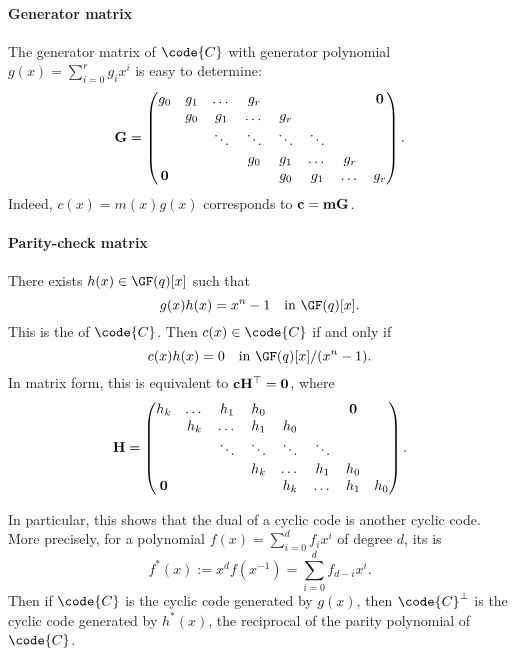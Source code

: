 \documentclass[a4paper, 11pt, openany]{book}
\begin{document}
\paragraph{Generator matrix}
The generator matrix of $\code{C}$ with generator polynomial $g(x) = \sum_{i=0}^r g_i x^i$ is easy to determine:
\[
	{\bf G} = \begin{pmatrix}
	g_0		& g_1	& \dots 	& g_r 		& 			& 			& 		& {\bf 0}\\
			& g_0	& g_1 		& \dots 	& g_r 		& 			& 		& \\
			&    	& \ddots 	& \ddots 	& \ddots 	& \ddots 	& 		& \\
			& 		& 			& g_0		& g_1		& \dots		& g_r	& \\
	{\bf 0}	& 		& 			&			& g_0		& g_1		& \dots	& g_r
	\end{pmatrix}.
\]
Indeed, $c(x) = m(x) g(x)$ corresponds to ${\bf c} = {\bf m} {\bf G}$.




\paragraph{Parity-check matrix}
There exists $h(x) \in \GF(q)[x]$ such that
\[
	g(x)h(x) = x^n - 1 \quad \text{in } \GF(q)[x].
\]
This is the  of $\code{C}$. Then $c(x) \in \code{C}$ if and only if
\[	c(x) h(x) = 0 \quad \text{in } \GF(q)[x] / (x^n - 1).
\]
In matrix form, this is equivalent to ${\bf c} {\bf H}^\top = {\bf 0}$, where
\[
	{\bf H} = \begin{pmatrix}
	h_k		& \dots	& h_1 		& h_0		& 			& 			& {\bf 0}\\
			& h_k	& \dots		& h_1	 	& h_0 		& 			& 		& \\
			&    	& \ddots 	& \ddots 	& \ddots 	& \ddots 	& 		& \\
			& 		& 			& h_k		& \dots		& h_1		& h_0	& \\
	{\bf 0}	& 		& 			&			& h_k		& \dots		& h_1	& h_0
	\end{pmatrix}.
\]

In particular, this shows that the dual of a cyclic code is another cyclic code. More precisely, for a polynomial $f(x) = \sum_{i=0}^d f_i x^i$ of degree $d$, its  is
\[
	f^*(x) := x^d f(x^{-1}) = \sum_{i=0}^d f_{d-i} x^i.
\]
Then if $\code{C}$ is the cyclic code generated by $g(x)$, then $\code{C}^\perp$ is the cyclic code generated by $h^*(x)$, the reciprocal of the parity polynomial of $\code{C}$.
\end{document}
